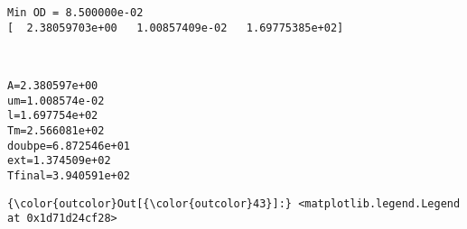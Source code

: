 \documentclass[11pt]{article}
\begin{document}
    \begin{Verbatim}[commandchars=\\\{\}]
Min OD = 8.500000e-02
[  2.38059703e+00   1.00857409e-02   1.69775385e+02]

    \end{Verbatim}

    \begin{center}
    \end{center}
    { \hspace*{\fill} \\}
    
    \begin{Verbatim}[commandchars=\\\{\}]
A=2.380597e+00
um=1.008574e-02
l=1.697754e+02
Tm=2.566081e+02
doubpe=6.872546e+01
ext=1.374509e+02
Tfinal=3.940591e+02

    \end{Verbatim}

            \begin{Verbatim}[commandchars=\\\{\}]
{\color{outcolor}Out[{\color{outcolor}43}]:} <matplotlib.legend.Legend at 0x1d71d24cf28>
\end{Verbatim}
        
    \begin{center}
    \end{center}
    { \hspace*{\fill} \\}
    
    \begin{center}
    \end{center}
    { \hspace*{\fill} \\}
    
\end{document}
